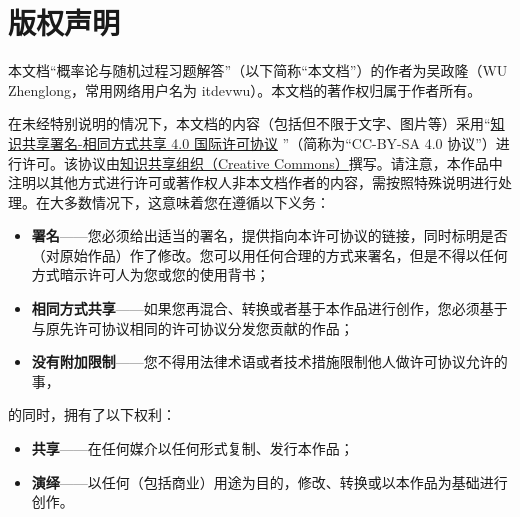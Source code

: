 





\section*{版权声明}

本文档“概率论与随机过程习题解答”（以下简称“本文档”）的作者为吴政隆（WU Zhenglong，常用网络用户名为 itdevwu）。本文档的著作权归属于作者所有。

在未经特别说明的情况下，本文档的内容（包括但不限于文字、图片等）采用“\href{https://creativecommons.org/licenses/by-sa/4.0/deed.zh}{知识共享署名-相同方式共享 4.0 国际许可协议} ”（简称为“CC-BY-SA 4.0 协议”）进行许可。该协议由\href{https://creativecommons.org/}{知识共享组织（Creative Commons）}撰写。请注意，本作品中注明以其他方式进行许可或著作权人非本文档作者的内容，需按照特殊说明进行处理。在大多数情况下，这意味着您在遵循以下义务：

\begin{itemize}
    \item \textbf{署名}——您必须给出适当的署名，提供指向本许可协议的链接，同时标明是否（对原始作品）作了修改。您可以用任何合理的方式来署名，但是不得以任何方式暗示许可人为您或您的使用背书；
    
    \item \textbf{相同方式共享}——如果您再混合、转换或者基于本作品进行创作，您必须基于与原先许可协议相同的许可协议分发您贡献的作品；
    
    \item \textbf{没有附加限制}——您不得用法律术语或者技术措施限制他人做许可协议允许的事，
    
\end{itemize}

\noindent 的同时，拥有了以下权利：

\begin{itemize}
    \item \textbf{共享}——在任何媒介以任何形式复制、发行本作品；
    
    \item \textbf{演绎}——以任何（包括商业）用途为目的，修改、转换或以本作品为基础进行创作。
    
\end{itemize} 

